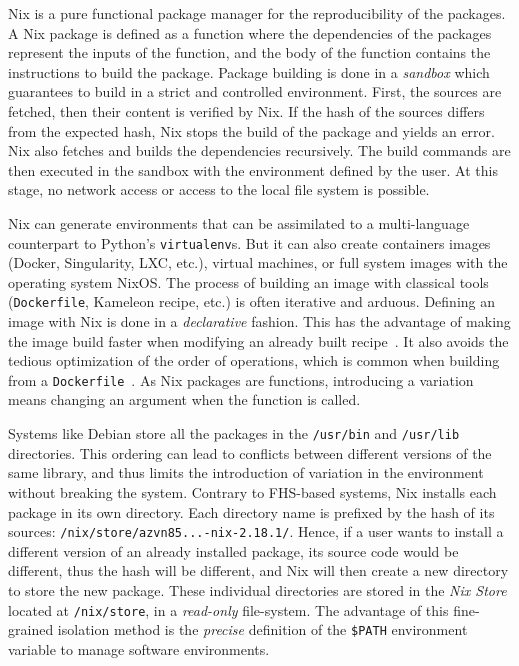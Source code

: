 \documentclass[sigconf,natbib=false]{acmart}
\begin{document}
Nix is a pure functional package manager for the reproducibility of the packages.
A Nix package is defined as a function where the dependencies of the packages represent the inputs of the function, and the body of the function contains the instructions to build the package.
Package building is done in a \emph{sandbox} which guarantees to build in a strict and controlled environment.
First, the sources are fetched, then their content is verified by Nix.
If the hash of the sources differs from the expected hash, Nix stops the build of the package and yields an error.
Nix also fetches and builds the dependencies recursively.
The build commands are then executed in the sandbox with the environment defined by the user.
At this stage, no network access or access to the local file system is possible.


Nix can generate environments that can be assimilated to a multi-language counterpart to Python's \texttt{virtualenv}s.
But it can also create containers images (Docker, Singularity, LXC, etc.), virtual machines, or full system images with the operating system NixOS.
The process of building an image with classical tools (\texttt{Dockerfile}, Kameleon recipe, etc.) is often iterative and arduous.
Defining an image with Nix is done in a \emph{declarative} fashion.
This has the advantage of making the image build faster when modifying an already built recipe\ \cite{nxc}.
It also avoids the tedious optimization of the order of operations, which is common when building from a \texttt{Dockerfile}\ \cite{docker_cache}. 
As Nix packages are functions, introducing a variation means changing an argument when the function is called.

Systems like Debian store all the packages in the \texttt{/usr/bin} and \texttt{/usr/lib} directories.
This ordering can lead to conflicts between different versions of the same library, and thus limits the introduction of variation in the environment without breaking the system.
Contrary to FHS-based systems, Nix installs each package in its own directory.
Each directory name is prefixed by the hash of its sources: \texttt{/nix/store/azvn85...-nix-2.18.1/}.
Hence, if a user wants to install a different version of an already installed package, its source code would be different, thus the hash will be different, and Nix will then create a new directory to store the new package.
These individual directories are stored in the \emph{Nix Store} located at \texttt{/nix/store}, in a \emph{read-only} file-system.
The advantage of this fine-grained isolation method is the \emph{precise} definition of the \texttt{\$PATH} environment variable to manage software environments.
\end{document}
